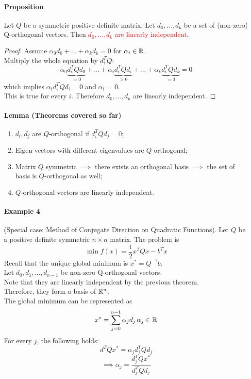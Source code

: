 \documentclass[11pt]{article}
\begin{document}
\paragraph{Proposition}
Let $Q$ be a symmetric positive definite matrix. Let $d_0, \hdots, d_k$ be a set of (non-zero) Q-orthogonal vectors. Then \textcolor{red}{$d_0, \hdots, d_k$ are linearly independent.} \\
\begin{proof}
	Assume $\alpha_0 d_0 + \hdots + \alpha_kd_k = 0$ for $\alpha_i \in \mathbb{R}$. \\
	Multiply the whole equation by $d_i^T Q$:
	$$\alpha_0 \underbrace{d_i^T Qd_0}_{=0} + \hdots + \alpha_i \underbrace{d_i^TQd_i}_{>0} + \hdots + \alpha_k \underbrace{d_i^T Qd_k}_{=0} = 0$$
	which implies $\alpha_i d_i^TQd_i = 0$ and $\alpha_i$ = 0. \\
	This is true for every $i$. Therefore $d_0, \hdots, d_k$ are linearly independent.
\end{proof}

\paragraph{Lemma (Theorems covered so far)}
\begin{enumerate}
	\item $d_i, d_j$ are $Q$-orthogonal if $d_i^TQd_j = 0$;
	\item Eigen-vectors with different eigenvalues are $Q$-orthogonal;
	\item Matrix $Q$ symmetric $\implies$ there exists an orthogonal basis $\implies$ the set of basis is $Q$-orthogonal as well;
	\item $Q$-orthogonal vectors are linearly independent.
\end{enumerate}

\paragraph{Example 4} (Special case: Method of Conjugate Direction on Quadratic Functions). Let $Q$ be a positive definite symmetric $n \times n$ matrix. The problem is
$$\min f(x) = \frac{1}{2}x^TQx - b^Tx$$
Recall that the unique global minimum is $x^* = Q^{-1}b$. \\
Let $d_0, d_1, \hdots, d_{n-1}$ be non-zero Q-orthogonal vectors. \\
Note that they are linearly independent by the previous theorem. \\
Therefore, they form a basis of $\mathbb{R}^n$. \\
The global minimum can be represented as 
$$x^* = \sum_{j=0}^{n-1} \alpha_j d_j \, \alpha_j \in \mathbb{R}$$
For every $j$, the following holds:
$$d^TQx^* = \alpha_jd_j^TQd_j$$
$$\implies \alpha_j = \frac{d_j^TQx^*}{d_j^TQd_j}$$
\end{document}
